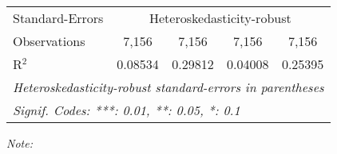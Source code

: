 \begin{table}[htbp!]
\begin{adjustbox}{width = 1\textwidth, max height = 0.95\textheight, center}
\begin{threeparttable}[b]
\begin{tabular}{lcccc}
            Standard-Errors & \multicolumn{4}{c}{Heteroskedasticity-robust} \\ 
            Observations         & 7,156                           & 7,156                          & 7,156                    & 7,156\\  
            R$^2$                & 0.08534                         & 0.29812                        & 0.04008                  & 0.25395\\  
            \midrule \midrule
            \multicolumn{5}{l}{\emph{Heteroskedasticity-robust standard-errors in parentheses}}\\
            \multicolumn{5}{l}{\emph{Signif. Codes: ***: 0.01, **: 0.05, *: 0.1}}\\
         \end{tabular}
         
         \begin{tablenotes}\item \medskip \textit{Note:}
         \end{tablenotes}
      \end{threeparttable}
   \end{adjustbox}
\end{table}


